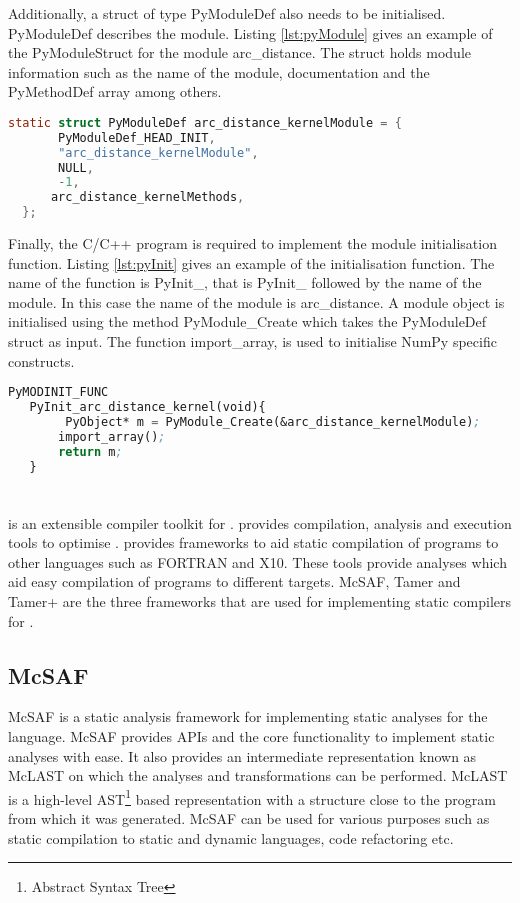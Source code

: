 Additionally, a struct of type PyModuleDef also needs to be initialised. PyModuleDef describes the module. Listing \ref{lst:pyModule} gives an example of the PyModuleStruct for the module arc\_distance. The struct holds module information such as the name of the module, documentation and the PyMethodDef array among others.
\begin{lstlisting}[language=C, label={lst:pyModule}, caption={Example of the PyModuleDef struct}]
 static struct PyModuleDef arc_distance_kernelModule = {
       PyModuleDef_HEAD_INIT,
       "arc_distance_kernelModule",
       NULL,
       -1,
      arc_distance_kernelMethods,
  };
\end{lstlisting}

 Finally, the C/C++ program is required to implement the module initialisation function. Listing \ref{lst:pyInit} gives an example of the initialisation function. The name of the function is PyInit\_<module name>, that is \textsf{PyInit\_} followed by the name of the module. In this case the name of the module is arc\_distance. A module object is initialised using the method PyModule\_Create which takes the PyModuleDef struct as input. The function import\_array, is used to initialise NumPy specific constructs. 
\begin{lstlisting}[float,language=lisp, label={lst:pyInit}, caption={Example of the module initialisation function for the module arc\_distance}]
 PyMODINIT_FUNC
   PyInit_arc_distance_kernel(void){
        PyObject* m = PyModule_Create(&arc_distance_kernelModule);
       import_array();
       return m;
   }

\end{lstlisting}
\section{\mclab}
\mclab is an extensible compiler toolkit for \matlab. \mclab provides compilation, analysis and execution tools to optimise \matlab. \mclab provides frameworks to aid static compilation of \matlab programs to other languages such as FORTRAN and X10. These tools provide analyses which aid easy compilation of \matlab programs to different targets. McSAF, Tamer and Tamer+ are the three frameworks that are used for implementing static compilers for \matlab. 
\subsection{McSAF}
McSAF is a static analysis framework for implementing static analyses for the \matlab language. McSAF provides APIs and the core functionality to implement static analyses with ease. It also provides an intermediate representation known as McLAST on which the analyses and transformations can be performed. McLAST is a high-level AST\footnote{Abstract Syntax Tree} based representation with a structure close to the \matlab program from which it was generated. McSAF can be used for various purposes such as static compilation to static and dynamic languages, code refactoring etc. 

